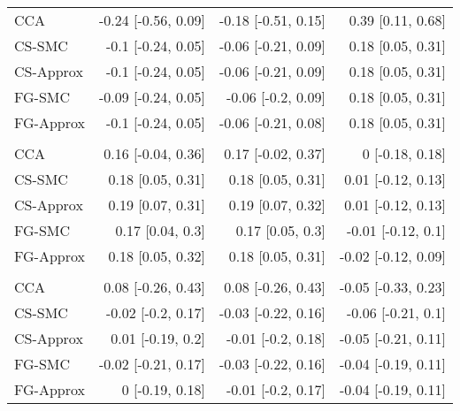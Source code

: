 \documentclass[
  12pt,
  a4paper,
]{article}
\begin{document}
\begin{longtable}[t]{lrrr}
\hspace{1em}CCA & -0.24 [-0.56, 0.09] & -0.18 [-0.51, 0.15] & 0.39 [0.11, 0.68]\\
\hspace{1em}CS-SMC & -0.1 [-0.24, 0.05] & -0.06 [-0.21, 0.09] & 0.18 [0.05, 0.31]\\
\hspace{1em}CS-Approx & -0.1 [-0.24, 0.05] & -0.06 [-0.21, 0.09] & 0.18 [0.05, 0.31]\\
\hspace{1em}FG-SMC & -0.09 [-0.24, 0.05] & -0.06 [-0.2, 0.09] & 0.18 [0.05, 0.31]\\
\hspace{1em}FG-Approx & -0.1 [-0.24, 0.05] & -0.06 [-0.21, 0.08] & 0.18 [0.05, 0.31]\\
\addlinespace[0.3em]
\multicolumn{4}{l}{\textbf{PB Blasts (per $5$\%)}}\\
\hspace{1em}CCA & 0.16 [-0.04, 0.36] & 0.17 [-0.02, 0.37] & 0 [-0.18, 0.18]\\
\hspace{1em}CS-SMC & 0.18 [0.05, 0.31] & 0.18 [0.05, 0.31] & 0.01 [-0.12, 0.13]\\
\hspace{1em}CS-Approx & 0.19 [0.07, 0.31] & 0.19 [0.07, 0.32] & 0.01 [-0.12, 0.13]\\
\hspace{1em}FG-SMC & 0.17 [0.04, 0.3] & 0.17 [0.05, 0.3] & -0.01 [-0.12, 0.1]\\
\hspace{1em}FG-Approx & 0.18 [0.05, 0.32] & 0.18 [0.05, 0.31] & -0.02 [-0.12, 0.09]\\
\addlinespace[0.3em]
\multicolumn{4}{l}{\textbf{Ruxolitinib given: yes}}\\
\hspace{1em}CCA & 0.08 [-0.26, 0.43] & 0.08 [-0.26, 0.43] & -0.05 [-0.33, 0.23]\\
\hspace{1em}CS-SMC & -0.02 [-0.2, 0.17] & -0.03 [-0.22, 0.16] & -0.06 [-0.21, 0.1]\\
\hspace{1em}CS-Approx & 0.01 [-0.19, 0.2] & -0.01 [-0.2, 0.18] & -0.05 [-0.21, 0.11]\\
\hspace{1em}FG-SMC & -0.02 [-0.21, 0.17] & -0.03 [-0.22, 0.16] & -0.04 [-0.19, 0.11]\\
\hspace{1em}FG-Approx & 0 [-0.19, 0.18] & -0.01 [-0.2, 0.17] & -0.04 [-0.19, 0.11]\\

\end{longtable}
\end{document}
